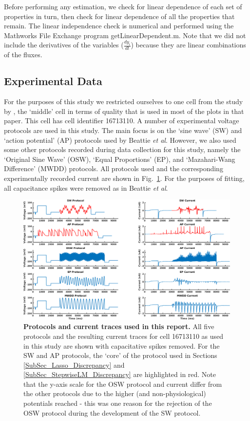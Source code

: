 \documentclass[11pt,a4paper,oneside]{article}
\begin{document}
Before performing any estimation, we check for linear dependence of each set of properties in turn, then check for linear dependence of all the properties that remain. The linear independence check is numerical and performed using the Mathworks File Exchange program getLinearDependent.m. Note that we did not include the derivatives of the variables ($\frac{dy_i}{dt}$) because they are linear combinations of the fluxes.

\subsection{Experimental Data}
For the purposes of this study we restricted ourselves to one cell from the study by \cite{}, the `middle' cell in terms of quality that is used in most of the plots in that paper. This cell has cell identifier 16713110. A number of experimental voltage protocols are used in this study. The main focus is on the `sine wave' (SW) and `action potential' (AP) protocols used by Beattie \textit{et al}\cite{Beattie2018}. However, we also used some other protocols recorded during data collection for this study, namely the `Original Sine Wave' (OSW), `Equal Proportions' (EP), and `Mazahari-Wang Difference' (MWDD) protocols. All protocols used and the corresponding experimentally recorded current are shown in Fig.~\ref{Fig_Protocols}. For the purposes of fitting, all capacitance spikes were removed as in Beattie \textit{et al}\cite{Beattie2018}.

\begin{figure}[t]
\begin{center}
\includegraphics[scale=0.42]{Figures/Protocols.png}
\caption{\textbf{Protocols and current traces used in this report.} All five protocols and the resulting current traces for cell 16713110 as used in this study are shown with capacitative spikes removed. For the SW and AP protocols, the `core' of the protocol used in Sections \ref{SubSec_Lasso_Discrepancy} and \ref{SubSec_StepwiseLM_Discrepancy} are highlighted in red. Note that the y-axis scale for the OSW protocol and current differ from the other protocols due to the higher (and non-physiological) potentials reached - this was one reason for the rejection of the OSW protocol during the development of the SW protocol.}
\label{Fig_Protocols}
\end{center}
\end{figure}
\end{document}

